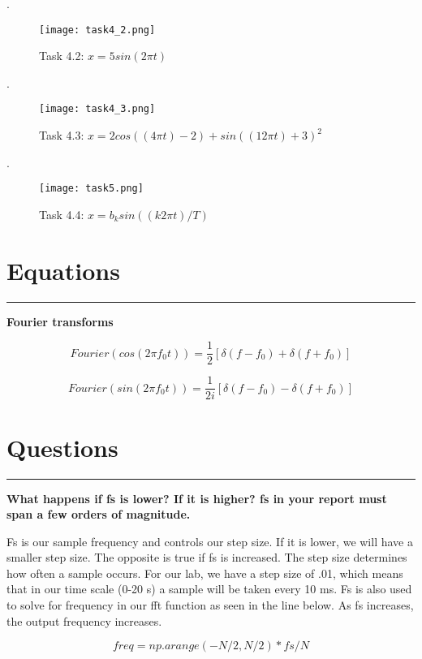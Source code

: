 \documentclass[12pt]{report}
\begin{document}
.
\vspace{3cm}
\begin{figure}[htp]
    \centering
    \texttt{[image: task4\_2.png]}
    \caption{Task 4.2: $x = 5sin(2\pi t)$ }
    \label{fig:ghj}
\end{figure}
\newpage

.
\vspace{3cm}
\begin{figure}[htp]
    \centering
    \texttt{[image: task4\_3.png]}
    \caption{Task 4.3: $x = 2cos((4\pi t)-2)+sin((12\pi t)+3)^{2}$ }
    \label{fig:ghj}
\end{figure}
\newpage

.
\vspace{3cm}
\begin{figure}[htp]
    \centering
    \texttt{[image: task5.png]}
    \caption{Task 4.4: $x=b_{k}sin((k2\pi t)/T)$ }
    \label{fig:ghj}
\end{figure}

\section*{Equations}
\hrule
\vspace{1cm}
\setlength{\parindent}{5ex}

\begin{center}
    \textbf{Fourier transforms}
\end{center}
$$Fourier({cos (2\pi f_{0}t)}) = \frac{1}{2} [\delta (f − f_{0}) + \delta (f + f_{0})]$$

$$Fourier({sin (2\pi f_{0}t)}) = \frac{1}{2i} [\delta (f − f_{0}) - \delta (f + f_{0})]$$

\newpage
\section*{Questions}
\hrule
\vspace{1cm}
\setlength{\parindent}{5ex}
\textbf{What happens if fs is lower? If it is higher? fs in your report must span a few orders of magnitude.}\par
\vspace{.5cm}

Fs is our sample frequency and controls our step size. If it is lower, we will have a smaller step size. The opposite is true if fs is increased. The step size determines how often a sample occurs. For our lab, we have a step size of .01, which means that in our time scale (0-20 s) a sample will be taken every 10 ms. Fs is also used to solve for frequency in our fft function as seen in the line below. As fs increases, the output frequency increases.\par
$$freq = np.arange ( - N /2 , N /2) * fs / N  $$
\end{document}

